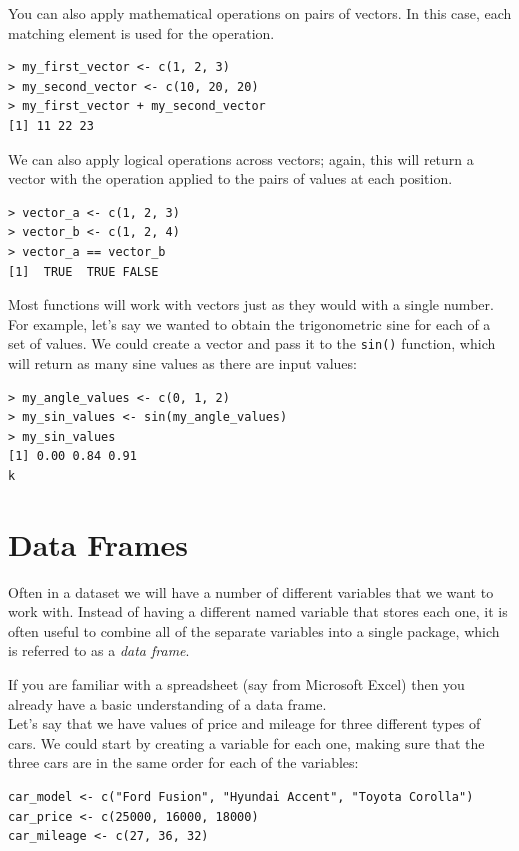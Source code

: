 \documentclass[
  12pt,
]{book}
\begin{document}
You can also apply mathematical operations on pairs of vectors. In this case, each matching element is used for the operation.

\begin{verbatim}
> my_first_vector <- c(1, 2, 3)
> my_second_vector <- c(10, 20, 20)
> my_first_vector + my_second_vector
[1] 11 22 23
\end{verbatim}

We can also apply logical operations across vectors; again, this will return a vector with the operation applied to the pairs of values at each position.

\begin{verbatim}
> vector_a <- c(1, 2, 3)
> vector_b <- c(1, 2, 4)
> vector_a == vector_b
[1]  TRUE  TRUE FALSE

\end{verbatim}

Most functions will work with vectors just as they would with a single number. For example, let's say we wanted to obtain the trigonometric sine for each of a set of values. We could create a vector and pass it to the \texttt{sin()} function, which will return as many sine values as there are input values:

\begin{verbatim}
> my_angle_values <- c(0, 1, 2)
> my_sin_values <- sin(my_angle_values)
> my_sin_values
[1] 0.00 0.84 0.91
k
\end{verbatim}

\hypertarget{data-frames}{%
\section{Data Frames}\label{data-frames}}

Often in a dataset we will have a number of different variables that we want to work with. Instead of having a different named variable that stores each one, it is often useful to combine all of the separate variables into a single package, which is referred to as a \emph{data frame}.

If you are familiar with a spreadsheet (say from Microsoft Excel) then you already have a basic understanding of a data frame.\\
Let's say that we have values of price and mileage for three different types of cars. We could start by creating a variable for each one, making sure that the three cars are in the same order for each of the variables:

\begin{verbatim}
car_model <- c("Ford Fusion", "Hyundai Accent", "Toyota Corolla")
car_price <- c(25000, 16000, 18000)
car_mileage <- c(27, 36, 32)
\end{verbatim}
\end{document}
